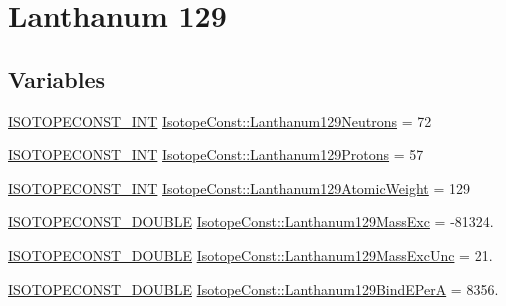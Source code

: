 \hypertarget{group___isotope_const-_lanthanum-_la129}{}\section{Lanthanum 129}
\label{group___isotope_const-_lanthanum-_la129}
\subsection*{Variables}
\begin{DoxyCompactItemize}
\item 
\mbox{\hyperlink{group___isotope_const-_macros_ga5f18360b3e99483a35c32d789e62621c}{I\+S\+O\+T\+O\+P\+E\+C\+O\+N\+S\+T\+\_\+\+I\+NT}} \mbox{\hyperlink{group___isotope_const-_lanthanum-_la129_gabc8171213648dea98aa8de3eb91b094b}{Isotope\+Const\+::\+Lanthanum129\+Neutrons}} = 72
\item 
\mbox{\hyperlink{group___isotope_const-_macros_ga5f18360b3e99483a35c32d789e62621c}{I\+S\+O\+T\+O\+P\+E\+C\+O\+N\+S\+T\+\_\+\+I\+NT}} \mbox{\hyperlink{group___isotope_const-_lanthanum-_la129_gab57fdf3688b9245f1ca385e5a9bf376b}{Isotope\+Const\+::\+Lanthanum129\+Protons}} = 57
\item 
\mbox{\hyperlink{group___isotope_const-_macros_ga5f18360b3e99483a35c32d789e62621c}{I\+S\+O\+T\+O\+P\+E\+C\+O\+N\+S\+T\+\_\+\+I\+NT}} \mbox{\hyperlink{group___isotope_const-_lanthanum-_la129_ga9494cf82905ae8baf914138acd4f5f41}{Isotope\+Const\+::\+Lanthanum129\+Atomic\+Weight}} = 129
\item 
\mbox{\hyperlink{group___isotope_const-_macros_ga8f45a7272ce02c0b4c65c44636ed719a}{I\+S\+O\+T\+O\+P\+E\+C\+O\+N\+S\+T\+\_\+\+D\+O\+U\+B\+LE}} \mbox{\hyperlink{group___isotope_const-_lanthanum-_la129_gac9f19ebae284e83fd92a626000a2b9d6}{Isotope\+Const\+::\+Lanthanum129\+Mass\+Exc}} = -\/81324.
\item 
\mbox{\hyperlink{group___isotope_const-_macros_ga8f45a7272ce02c0b4c65c44636ed719a}{I\+S\+O\+T\+O\+P\+E\+C\+O\+N\+S\+T\+\_\+\+D\+O\+U\+B\+LE}} \mbox{\hyperlink{group___isotope_const-_lanthanum-_la129_ga80743902d645f1f5369efbc0986af489}{Isotope\+Const\+::\+Lanthanum129\+Mass\+Exc\+Unc}} = 21.
\item 
\mbox{\hyperlink{group___isotope_const-_macros_ga8f45a7272ce02c0b4c65c44636ed719a}{I\+S\+O\+T\+O\+P\+E\+C\+O\+N\+S\+T\+\_\+\+D\+O\+U\+B\+LE}} \mbox{\hyperlink{group___isotope_const-_lanthanum-_la129_ga72cbc208d88e004ee32b699f3f3b4f8e}{Isotope\+Const\+::\+Lanthanum129\+Bind\+E\+PerA}} = 8356.
\item 

\end{DoxyCompactItemize}
